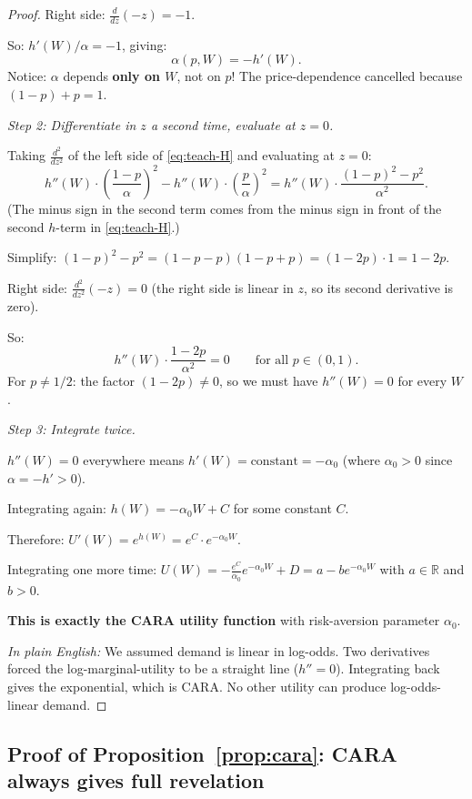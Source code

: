 \documentclass[12pt,letterpaper]{article}
\theoremstyle{definition}
\theoremstyle{remark}
\newcommand{\1}{\mathbf{1}}
\begin{document}
\begin{proof}
Right side: $\frac{d}{dz}(-z) = -1$.

So: $h'(W)/\alpha = -1$, giving:
\[
   \boxed{\alpha(p,W) = -h'(W).}
\]
Notice: $\alpha$ depends \textbf{only on $W$}, not on $p$! The
price-dependence cancelled because $(1-p) + p = 1$.

\emph{Step 2: Differentiate in $z$ a second time, evaluate at $z = 0$.}

Taking $\frac{d^2}{dz^2}$ of the left side of \eqref{eq:teach-H} and
evaluating at $z = 0$:
\[
   h''(W) \cdot \left(\frac{1-p}{\alpha}\right)^2
   - h''(W) \cdot \left(\frac{p}{\alpha}\right)^2
   = h''(W) \cdot \frac{(1-p)^2 - p^2}{\alpha^2}.
\]
(The minus sign in the second term comes from the minus sign in front of
the second $h$-term in \eqref{eq:teach-H}.)

Simplify: $(1-p)^2 - p^2 = (1-p-p)(1-p+p) = (1-2p) \cdot 1 = 1-2p$.

Right side: $\frac{d^2}{dz^2}(-z) = 0$ (the right side is linear in
$z$, so its second derivative is zero).

So:
\[
   h''(W) \cdot \frac{1-2p}{\alpha^2} = 0
   \qquad \text{for all } p \in (0,1).
\]
For $p \neq 1/2$: the factor $(1-2p) \neq 0$, so we must have
$\boxed{h''(W) = 0}$ for every $W$.

\emph{Step 3: Integrate twice.}

$h''(W) = 0$ everywhere means $h'(W) = \text{constant} = -\alpha_0$
(where $\alpha_0 > 0$ since $\alpha = -h' > 0$).

Integrating again: $h(W) = -\alpha_0 W + C$ for some constant $C$.

Therefore: $U'(W) = e^{h(W)} = e^{C} \cdot e^{-\alpha_0 W}$.

Integrating one more time:
$U(W) = -\frac{e^C}{\alpha_0} e^{-\alpha_0 W} + D = a - b e^{-\alpha_0 W}$
with $a \in \mathbb{R}$ and $b > 0$.

\textbf{This is exactly the CARA utility function} with risk-aversion
parameter $\alpha_0$.

\emph{In plain English:} We assumed demand is linear in log-odds. Two
derivatives forced the log-marginal-utility to be a straight line
($h'' = 0$). Integrating back gives the exponential, which is CARA.
No other utility can produce log-odds-linear demand.
\end{proof}

\subsection*{Proof of Proposition~\ref{prop:cara}: CARA always gives
full revelation}
\end{document}
